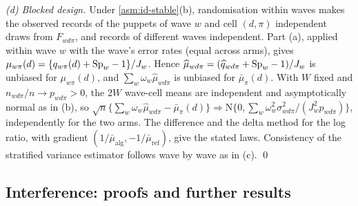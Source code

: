 \emph{(d) Blocked design.} Under \cref{asm:id-stable}(b), randomisation within waves makes the observed records of the puppets of wave $w$ and cell $(d,\pi)$ independent draws from $F_{wd\pi}$, and records of different waves independent. Part (a), applied within wave $w$ with the wave's error rates (equal across arms), gives $\mu_{w\pi}(d)=\{q_{w\pi}(d)+\mathrm{Sp}_w-1\}/J_w$. Hence $\widehat\mu_{wd\pi}=(\widehat q_{wd\pi}+\mathrm{Sp}_w-1)/J_w$ is unbiased for $\mu_{w\pi}(d)$, and $\sum_w\omega_w\widehat\mu_{wd\pi}$ is unbiased for $\bar\mu_\pi(d)$. With $W$ fixed and $n_{wd\pi}/n\to p_{wd\pi}>0$, the $2W$ wave-cell means are independent and asymptotically normal as in (b), so $\sqrt n\{\sum_w\omega_w\widehat\mu_{wd\pi}-\bar\mu_\pi(d)\}\Rightarrow\mathrm N\{0,\sum_w\omega_w^2\sigma^2_{wd\pi}/(J_w^2p_{wd\pi})\}$, independently for the two arms. The difference and the delta method for the log ratio, with gradient $(1/\bar\mu_{\mathrm{alg}},-1/\bar\mu_{\mathrm{ref}})$, give the stated laws. Consistency of the stratified variance estimator follows wave by wave as in (c).
\qed

\subsection{Interference: proofs and further results}\label{app:pf-interference}

